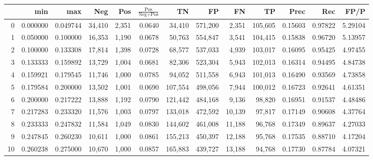 \begin{tabular}{rrrrrrrrrrrrr}
\toprule
{} &       min &       max &     Neg &    Pos & $\frac{\text{Pos}}{\text{Neg}+\text{Pos}}$ &       TN &       FP &       FN &       TP &     Prec &      Rec &     FP/P \\
\midrule
0   &  0.000000 &  0.049744 &  34,410 &  2,351 &                                     0.0640 &   34,410 &  571,200 &    2,351 &  105,605 &  0.15603 &  0.97822 &  5.29104 \\
1   &  0.050000 &  0.100000 &  16,353 &  1,190 &                                     0.0678 &   50,763 &  554,847 &    3,541 &  104,415 &  0.15838 &  0.96720 &  5.13957 \\
2   &  0.100000 &  0.133308 &  17,814 &  1,398 &                                     0.0728 &   68,577 &  537,033 &    4,939 &  103,017 &  0.16095 &  0.95425 &  4.97455 \\
3   &  0.133333 &  0.159892 &  13,729 &  1,004 &                                     0.0681 &   82,306 &  523,304 &    5,943 &  102,013 &  0.16314 &  0.94495 &  4.84738 \\
4   &  0.159921 &  0.179545 &  11,746 &  1,000 &                                     0.0785 &   94,052 &  511,558 &    6,943 &  101,013 &  0.16490 &  0.93569 &  4.73858 \\
5   &  0.179584 &  0.200000 &  13,502 &  1,001 &                                     0.0690 &  107,554 &  498,056 &    7,944 &  100,012 &  0.16723 &  0.92641 &  4.61351 \\
6   &  0.200000 &  0.217222 &  13,888 &  1,192 &                                     0.0790 &  121,442 &  484,168 &    9,136 &   98,820 &  0.16951 &  0.91537 &  4.48486 \\
7   &  0.217283 &  0.233320 &  11,576 &  1,003 &                                     0.0797 &  133,018 &  472,592 &   10,139 &   97,817 &  0.17149 &  0.90608 &  4.37764 \\
8   &  0.233333 &  0.247832 &  11,584 &  1,049 &                                     0.0830 &  144,602 &  461,008 &   11,188 &   96,768 &  0.17349 &  0.89637 &  4.27033 \\
9   &  0.247845 &  0.260230 &  10,611 &  1,000 &                                     0.0861 &  155,213 &  450,397 &   12,188 &   95,768 &  0.17535 &  0.88710 &  4.17204 \\
10  &  0.260238 &  0.275000 &  10,670 &  1,000 &                                     0.0857 &  165,883 &  439,727 &   13,188 &   94,768 &  0.17730 &  0.87784 &  4.07321 \\

\end{tabular}
